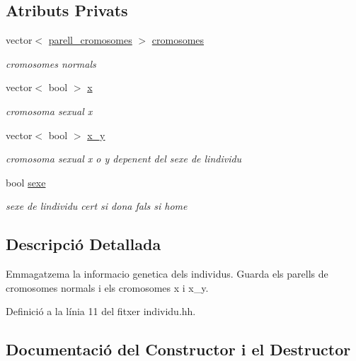 \subsection*{Atributs Privats}
\begin{DoxyCompactItemize}
\item 
vector$<$ \hyperlink{classparell__cromosomes}{parell\+\_\+cromosomes} $>$ \hyperlink{classindividu_ae5e0a83ff9e943cbcdf95b74069ad3a7}{cromosomes}
\begin{DoxyCompactList}\small\item\em cromosomes normals \end{DoxyCompactList}\item 
vector$<$ bool $>$ \hyperlink{classindividu_a3c4abda8daead156b5519f69bd224fa9}{x}
\begin{DoxyCompactList}\small\item\em cromosoma sexual x \end{DoxyCompactList}\item 
vector$<$ bool $>$ \hyperlink{classindividu_a51eb7827fdd5bd5302e3c962fd719fc0}{x\+\_\+y}
\begin{DoxyCompactList}\small\item\em cromosoma sexual x o y depenent del sexe de l\textquotesingle{}individu \end{DoxyCompactList}\item 
bool \hyperlink{classindividu_ab62faa6985cc0520c33a206fc5a89e37}{sexe}
\begin{DoxyCompactList}\small\item\em sexe de l\textquotesingle{}individu cert si dona fals si home \end{DoxyCompactList}\end{DoxyCompactItemize}


\subsection{Descripció Detallada}
Emmagatzema la informacio genetica dels individus. Guarda els parells de cromosomes normals i els cromosomes x i x\+\_\+y. 

Definició a la línia 11 del fitxer individu.\+hh.



\subsection{Documentació del Constructor i el Destructor}
